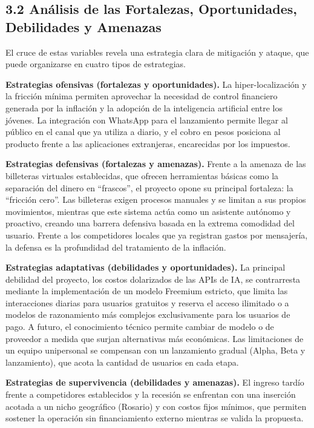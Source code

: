 \subsection*{3.2 Análisis de las Fortalezas, Oportunidades, Debilidades
y
Amenazas}\label{anuxe1lisis-de-las-fortalezas-oportunidades-debilidades-y-amenazas}

El cruce de estas variables revela una estrategia clara de mitigación y
ataque, que puede organizarse en cuatro tipos de estrategias.

\textbf{Estrategias ofensivas (fortalezas y oportunidades).} La
hiper-localización y la fricción mínima permiten aprovechar la necesidad
de control financiero generada por la inflación y la adopción de la
inteligencia artificial entre los jóvenes. La integración con WhatsApp
para el lanzamiento permite llegar al público en el canal que ya utiliza
a diario, y el cobro en pesos posiciona al producto frente a las
aplicaciones extranjeras, encarecidas por los impuestos.

\textbf{Estrategias defensivas (fortalezas y amenazas).} Frente a la
amenaza de las billeteras virtuales establecidas, que ofrecen
herramientas básicas como la separación del dinero en ``frascos'', el
proyecto opone su principal fortaleza: la ``fricción cero''. Las
billeteras exigen procesos manuales y se limitan a sus propios
movimientos, mientras que este sistema actúa como un asistente autónomo
y proactivo, creando una barrera defensiva basada en la extrema
comodidad del usuario. Frente a los competidores locales que ya
registran gastos por mensajería, la defensa es la profundidad del
tratamiento de la inflación.

\textbf{Estrategias adaptativas (debilidades y oportunidades).} La
principal debilidad del proyecto, los costos dolarizados de las APIs de
IA, se contrarresta mediante la implementación de un modelo Freemium
estricto, que limita las interacciones diarias para usuarios gratuitos y
reserva el acceso ilimitado o a modelos de razonamiento más complejos
exclusivamente para los usuarios de pago. A futuro, el conocimiento
técnico permite cambiar de modelo o de proveedor a medida que surjan
alternativas más económicas. Las limitaciones de un equipo unipersonal
se compensan con un lanzamiento gradual (Alpha, Beta y lanzamiento), que
acota la cantidad de usuarios en cada etapa.

\textbf{Estrategias de supervivencia (debilidades y amenazas).} El
ingreso tardío frente a competidores establecidos y la recesión se
enfrentan con una inserción acotada a un nicho geográfico (Rosario) y
con costos fijos mínimos, que permiten sostener la operación sin
financiamiento externo mientras se valida la propuesta.

